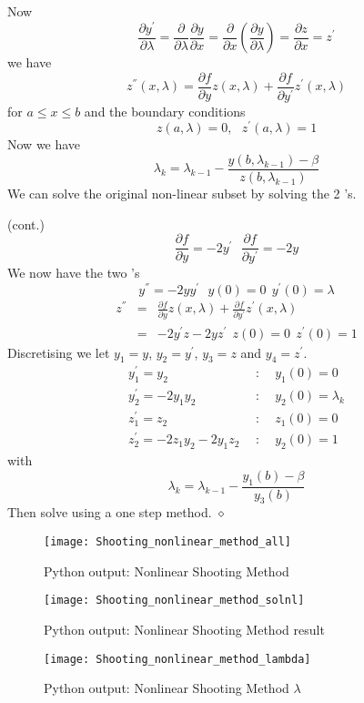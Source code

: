 Now 
\[\frac{\partial y^{'} }{\partial \lambda}=\frac{\partial}{\partial \lambda}\frac{\partial y}{\partial x}
=\frac{\partial }{\partial x}\left( \frac{\partial y}{\partial \lambda}\right)
=\frac{\partial z}{\partial x}=z^{'}\]
we have
\[ z^{''}(x,\lambda)=\frac{\partial f}{\partial y}z(x,\lambda)+\frac{\partial f}{\partial y^{'}}z^{'}(x,\lambda) \]
for $a \leq x \leq b$ and the boundary conditions
\[z(a,\lambda)=0, \ \ \ z^{'}(a,\lambda)=1 \]
Now we have 
\[\lambda_k=\lambda_{k-1}-\frac{y(b,\lambda_{k-1})-\beta}{z(b,\lambda_{k-1})}\]
We can solve the original non-linear subset  by solving the 2 's.
\begin{example}(cont.)\\
\[\frac{\partial f}{\partial y}=-2y^{'} \ \ \ \frac{\partial f}{\partial y^{'}}=-2y\]
We now have the two 's
\[y^{''}=-2yy^{'} \ \ \ y(0)=0 \ \ y^{'}(0)=\lambda \]
\begin{eqnarray*}
z^{''}&=&\frac{\partial f}{\partial y}z(x,\lambda)+\frac{\partial f}{\partial y^{'}}z^{'}(x,\lambda)\\
&=&-2y^{'}z-2yz^{'} \ \ z(0)=0 \ \ z^{'}(0)=1 \end{eqnarray*}
Discretising we let $y_1=y$, $y_2=y^{'}$, $y_3=z$ and $y_4=z^{'}$.
\begin{eqnarray*}
y_1^{'}=y_2 &\ \ : \ \  &y_1(0)=0 \\
y_2^{'}=-2y_1y_2 &\ \ : \ \  &y_2(0)=\lambda_k \\
z_1^{'}=z_2 &\ \ : \ \  &z_1(0)=0 \\
z_2^{'}=-2z_1y_2-2y_1z_2 &\ \ : \ \  &y_2(0)=1 
\end{eqnarray*}
with
\[\lambda_k=\lambda_{k-1}-\frac{y_1(b)-\beta}{y_3(b)} \]
Then solve using a one step method.
$\diamond$
\end{example}


\begin{figure}[H]
\centering
\texttt{[image: Shooting\_nonlinear\_method\_all]}
\caption{Python output: Nonlinear Shooting Method}
\label{Shooting_method_nl}
\end{figure}

\begin{figure}[H]
\centering
\texttt{[image: Shooting\_nonlinear\_method\_solnl]}
\caption{Python output: Nonlinear Shooting Method result}
\label{Shooting_method_error}
\end{figure}

\begin{figure}[H]
\centering
\texttt{[image: Shooting\_nonlinear\_method\_lambda]}
\caption{Python output: Nonlinear Shooting Method $\lambda$}
\label{Shooting_method_error}
\end{figure}



